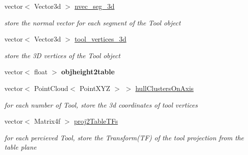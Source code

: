\begin{DoxyCompactItemize}
\mbox{\label{classCreate__Tool_ae753f1f8f15b2e6739e6776642eb4c34}} 
vector$<$ Vector3d $>$ \hyperlink{classCreate__Tool_ae753f1f8f15b2e6739e6776642eb4c34}{nvec\+\_\+seg\+\_\+3d}
\begin{DoxyCompactList}\small\item\em store the normal vector for each segment of the \textquotesingle{}Tool\textquotesingle{} object \end{DoxyCompactList}\item 
\mbox{\label{classCreate__Tool_ae02f96935f6b0d5c2a6d76bd421707fc}} 
vector$<$ Vector3d $>$ \hyperlink{classCreate__Tool_ae02f96935f6b0d5c2a6d76bd421707fc}{tool\+\_\+vertices\+\_\+3d}
\begin{DoxyCompactList}\small\item\em store the 3D vertices of the \textquotesingle{}Tool\textquotesingle{} object \end{DoxyCompactList}\item 
\mbox{\label{classCreate__Tool_ae6da0d94feda4e8bb996750d20bf7218}} 
vector$<$ float $>$ {\bfseries objheight2table}
\item 
\mbox{\label{classCreate__Tool_a86c971fb3705f2d8113118209ca2fba0}} 
vector$<$ Point\+Cloud$<$ Point\+X\+YZ $>$ $>$ \hyperlink{classCreate__Tool_a86c971fb3705f2d8113118209ca2fba0}{hull\+Clusters\+On\+Axis}
\begin{DoxyCompactList}\small\item\em for each number of \textquotesingle{}Tool\textquotesingle{}, store the 3d coordinates of tool vertices \end{DoxyCompactList}\item 
\mbox{\label{classCreate__Tool_abb97ac15169e5df1831b8b8fbf5e4ece}} 
vector$<$ Matrix4f $>$ \hyperlink{classCreate__Tool_abb97ac15169e5df1831b8b8fbf5e4ece}{proj2\+Table\+T\+Fs}
\begin{DoxyCompactList}\small\item\em for each percieved \textquotesingle{}Tool\textquotesingle{}, store the Transform(\+T\+F) of the tool projection from the table plane \end{DoxyCompactList}\item 
\mbox{\label{classCreate__Tool_a3da16d94dd66220185c1adcec47416af}} 

\end{DoxyCompactItemize}
